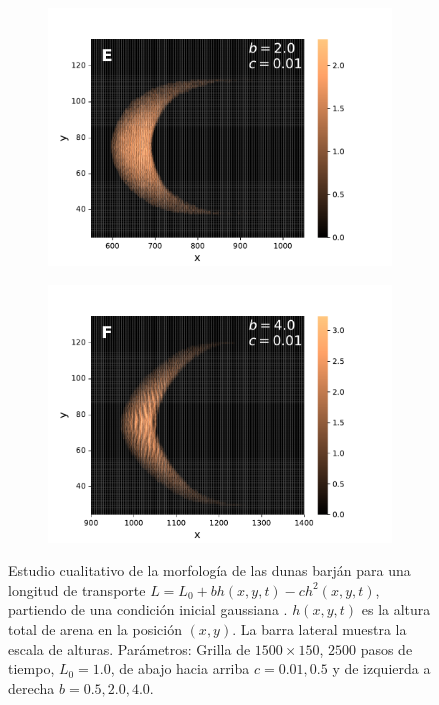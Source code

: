 \documentclass[11pt,twocolumn,twoside]{opticajnl}
\begin{document}
\begin{figure}[t]
\begin{subfigure}[b]{0.3\linewidth}
         \includegraphics[width=1.1\textwidth]{Figuras/E.pdf}
         \label{fig:E}
     \end{subfigure}
    \begin{subfigure}[b]{0.3\linewidth}
        \raggedright
         \includegraphics[width=1.1\textwidth]{Figuras/F.pdf}
         \label{fig:F}
     \end{subfigure}
\caption{\centering Estudio cualitativo de la morfología de las dunas barján para una longitud de transporte $L = L_0 + bh(x,y,t) - ch^2(x,y,t)$, partiendo de una condición inicial gaussiana . $h(x,y,t)$ es la altura total de arena en la posición $(x,y)$. La barra lateral muestra la escala de alturas. Parámetros: Grilla de $1500 \times 150$, $2500$ pasos de tiempo, $L_0 = 1.0$, de abajo hacia arriba $c=0.01,0.5$ y de izquierda a derecha $b=0.5,2.0,4.0$.}
\label{fig:morfología}
\end{figure}
\end{document}
